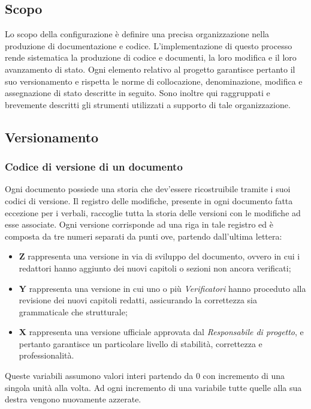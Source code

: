 \subsection{Scopo}\label{ProcessiDiSupportoGestioneDellaConfigurazioneScopo}
Lo scopo della configurazione è definire una precisa organizzazione nella produzione di documentazione e codice.
L'implementazione di questo processo rende sistematica la produzione di codice e documenti, la loro modifica e il loro avanzamento di stato.
Ogni elemento relativo al progetto garantisce pertanto il suo versionamento e rispetta le norme di collocazione, denominazione, modifica e assegnazione di stato descritte in seguito.
Sono inoltre qui raggruppati e brevemente descritti gli strumenti utilizzati a supporto di tale organizzazione.
\subsection{Versionamento}\label{ProcessiDiSupportoGestioneDellaConfigurazioneVersionamento}
\subsubsection{Codice di versione di un documento}\label{ProcessiDiSupportoGestioneDellaConfigurazioneVersionamentoCodiceDiVersioneDiUnDocumento}
Ogni documento possiede una storia che dev'essere ricostruibile tramite i suoi codici di versione.
Il registro delle modifiche, presente in ogni documento fatta eccezione per i verbali, raccoglie tutta la storia delle versioni con le modifiche ad esse associate.
Ogni versione corrisponde ad una riga in tale registro ed è composta da tre numeri separati da punti
ove, partendo dall'ultima lettera:
\begin{itemize}
  \item \textbf{Z} rappresenta una versione in via di sviluppo del documento, ovvero in cui i redattori hanno aggiunto dei nuovi capitoli o sezioni non ancora verificati;
  \item \textbf{Y} rappresenta una versione in cui uno o più \textit{Verificatori} hanno proceduto alla revisione dei nuovi capitoli redatti, assicurando la correttezza sia grammaticale che strutturale;
  \item \textbf{X} rappresenta una versione ufficiale approvata dal \textit{Responsabile di progetto}, e pertanto garantisce un particolare livello di stabilità, correttezza e professionalità.
\end{itemize}
Queste variabili assumono valori interi partendo da 0 con incremento di una singola unità alla volta.
Ad ogni incremento di una variabile tutte quelle alla sua destra vengono nuovamente azzerate.
